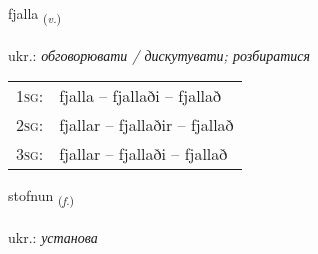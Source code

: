 \documentclass[frontgrid, backgrid]{flacards}\usepackage[]{graphicx}\usepackage[]{xcolor}
\begin{document}
\renewcommand{\blhead}{\vskip5pt {\small\bfseries\footnotesize Sagnorð | дієслово }}
\renewcommand{\bcfoot}{\vskip5pt \hspace{2pt}{\small\bfseries\footnotesize 1K}}


{fjalla \small{\textsubscript{(\textit{v.})}} \\[1ex] %
\textphonetic{[fjatla]} \\
ukr.: \emph{обговорювати / дискутувати; розбиратися} \\  [2ex]
\renewcommand*{\arraystretch}{0.8}
\begin{tabular}{p{1cm}l}
\textsc{1sg}: & fjalla -- fjallaði -- fjallað \\ 
\textsc{2sg}: & fjallar -- fjallaðir -- fjallað \\ 
\textsc{3sg}: & fjallar -- fjallaði -- fjallað \\ 
\end{tabular}
}

\renewcommand{\flhead}{\vskip5pt \fboxsep=0pt {\small\bfseries\footnotesize Nafnorð | іменник}}
\renewcommand{\fcfoot}{\vskip5pt \fboxsep=0pt \hspace{2pt}{\small\bfseries\footnotesize 1K}}

\renewcommand{\blhead}{\vskip5pt {\small\bfseries\footnotesize Nafnorð | іменник }}
\renewcommand{\bcfoot}{\vskip5pt \hspace{2pt}{\small\bfseries\footnotesize 1K}}


{stofnun \small{\textsubscript{(\textit{f.})}} \\[1ex] %
\textphonetic{[stɔpnʏn]} \\
ukr.: \emph{установа} \\  [2ex]
\renewcommand*{\arraystretch}{0.8}
}
\end{document}
